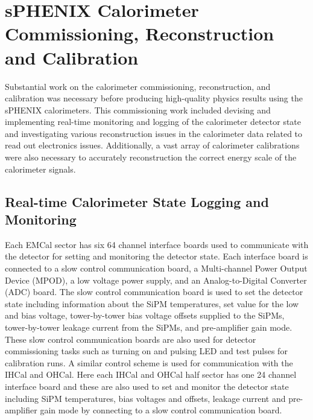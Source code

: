 \chapter{sPHENIX Calorimeter Commissioning, Reconstruction and Calibration}
\label{ch:reconstruction}

Substantial work on the calorimeter commissioning, reconstruction, and calibration was necessary before producing high-quality physics results using the sPHENIX calorimeters.
This commissioning work included devising and implementing real-time monitoring and logging of the calorimeter detector state and investigating various reconstruction issues in the calorimeter data related to read out electronics issues.
Additionally, a vast array of calorimeter calibrations were also necessary to accurately reconstruction the correct energy scale of the calorimeter signals. 

\section{Real-time Calorimeter State Logging and Monitoring}

Each EMCal sector has six 64 channel interface boards used to communicate with the detector for setting and monitoring the detector state.
Each interface board is connected to a slow control communication board, a Multi-channel Power Output Device (MPOD), a low voltage power supply, and an Analog-to-Digital Converter (ADC) board.
The slow control communication board is used to set the detector state including information about the SiPM temperatures, set value for the low and bias voltage, tower-by-tower bias voltage offsets supplied to the SiPMs, tower-by-tower leakage current from the SiPMs, and pre-amplifier gain mode. 
These slow control communication boards are also used for detector commissioning tasks such as turning on and pulsing LED and test pulses for calibration runs.
A similar control scheme is used for communication with the IHCal and OHCal.
Here each IHCal and OHCal half sector has one 24 channel interface board and these are also used to set and monitor the detector state including SiPM temperatures, bias voltages and offsets, leakage current and pre-amplifier gain mode by connecting to a slow control communication board.

